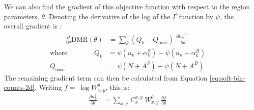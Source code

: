 \documentclass[
    ,final            %
  ]
  {aipproc}
\begin{document}
We can also find the gradient of this objective function with respect to the region parameters, $\theta$. Denoting the derivative of the log of the $\Gamma$ function by $\psi$, the overall gradient is \cite{AnnaThesis}:
\begin{align}
\frac{\partial}{\partial\theta}\text{DMR}(\theta) 
&= \sum_k (Q_k - Q_\text{base}) \; \frac{\partial n_k^{(\theta)}}{\partial\theta} 
\end{align}
\begin{align*}
\text{where} \;\;\;\;\;\;\;\;\;\;\;\;\;\;
Q_k &= \psi(n_k + \alpha^S_k) - \psi(n_k + \alpha^B_k)   \\
Q_\text{base} &= \psi(N+A^S) - \psi(N+A^B)
\end{align*}
The remaining gradient term can then be calculated \cite{AnnaThesis} from Equation \ref{eq:soft-bin-counts-2d}. Writing $f = \; \log W^{\theta}_{x,y}$, this is:
\begin{align}
\frac{\partial n_k^{\theta}}{\partial\theta} %
&= \sum_{x,y} \, C^{x,y}_k \;  W^{\theta}_{x,y} \; \frac{\partial f}{\partial\theta} 
\label{eq:general-gradient}
\end{align}
\end{document}
